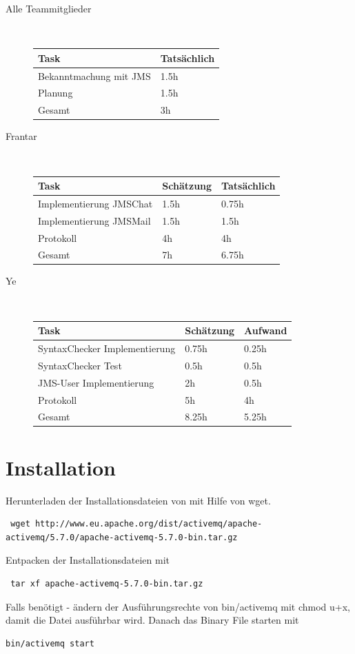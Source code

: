 \documentclass[11pt, a4paper]{article}
\begin{document}
\begin{description}
\item[Alle Teammitglieder] \hfill \\
  \begin{tabular} {| l | l |}
    \hline
    Task & Tatsächlich \\ \hline
    Bekanntmachung mit JMS & 1.5h \\ \hline
    Planung & 1.5h \\ \hline
    \hline
    Gesamt & 3h \\ \hline
  \end{tabular}

\item[Frantar] \hfill \\

  \begin{tabular} {| l | l | l |}
    \hline
    Task & Schätzung & Tatsächlich \\ \hline
    Implementierung JMSChat & 1.5h & 0.75h \\ \hline
    Implementierung JMSMail & 1.5h & 1.5h \\ \hline
    Protokoll & 4h & 4h \\ \hline
    \hline
    Gesamt & 7h & 6.75h \\ \hline
  \end{tabular}

\item[Ye] \hfill \\
    \begin{tabular} {| l | l | l |}
      \hline
      Task & Schätzung & Aufwand \\ \hline
      SyntaxChecker Implementierung & 0.75h & 0.25h \\ \hline
      SyntaxChecker Test & 0.5h & 0.5h \\ \hline
      JMS-User Implementierung & 2h & 0.5h \\ \hline
      Protokoll & 5h & 4h \\ \hline
      \hline
      Gesamt & 8.25h & 5.25h \\ \hline
    \end{tabular}
\end{description}

\section{Installation}
Herunterladen der Installationsdateien von \cite{activemqdownload} mit Hilfe von wget.
\begin{lstlisting}
 wget http://www.eu.apache.org/dist/activemq/apache-activemq/5.7.0/apache-activemq-5.7.0-bin.tar.gz
\end{lstlisting}
Entpacken der Installationsdateien mit
\begin{lstlisting}
 tar xf apache-activemq-5.7.0-bin.tar.gz
\end{lstlisting}
Falls benötigt - ändern der Ausführungsrechte von bin/activemq mit chmod u+x, damit die Datei ausführbar wird.
Danach das Binary File starten mit
\begin{lstlisting}
bin/activemq start
\end{lstlisting}
\end{document}
